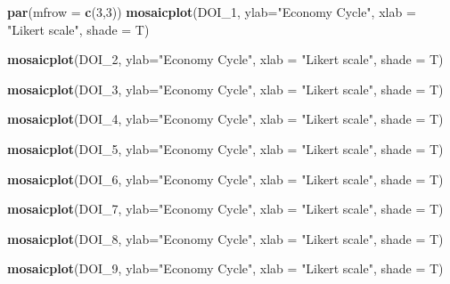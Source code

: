 \documentclass[
]{article}
\newenvironment{Shaded}{\begin{snugshade}}{\end{snugshade}}
\newcommand{\DataTypeTok}[1]{\textcolor[rgb]{0.13,0.29,0.53}{#1}}
\newcommand{\DecValTok}[1]{\textcolor[rgb]{0.00,0.00,0.81}{#1}}
\newcommand{\KeywordTok}[1]{\textcolor[rgb]{0.13,0.29,0.53}{\textbf{#1}}}
\newcommand{\NormalTok}[1]{#1}
\newcommand{\StringTok}[1]{\textcolor[rgb]{0.31,0.60,0.02}{#1}}
\begin{document}
\begin{Shaded}
\begin{Highlighting}[]
\KeywordTok{par}\NormalTok{(}\DataTypeTok{mfrow =} \KeywordTok{c}\NormalTok{(}\DecValTok{3}\NormalTok{,}\DecValTok{3}\NormalTok{))}
   \KeywordTok{mosaicplot}\NormalTok{(DOI_}\DecValTok{1}\NormalTok{, }\DataTypeTok{ylab=}\StringTok{"Economy Cycle"}\NormalTok{, }\DataTypeTok{xlab =} \StringTok{"Likert scale"}\NormalTok{,}
               \DataTypeTok{shade =}\NormalTok{ T)}
    
    \KeywordTok{mosaicplot}\NormalTok{(DOI_}\DecValTok{2}\NormalTok{, }\DataTypeTok{ylab=}\StringTok{"Economy Cycle"}\NormalTok{, }\DataTypeTok{xlab =} \StringTok{"Likert scale"}\NormalTok{,}
               \DataTypeTok{shade =}\NormalTok{ T)}
    
    \KeywordTok{mosaicplot}\NormalTok{(DOI_}\DecValTok{3}\NormalTok{, }\DataTypeTok{ylab=}\StringTok{"Economy Cycle"}\NormalTok{, }\DataTypeTok{xlab =} \StringTok{"Likert scale"}\NormalTok{,}
               \DataTypeTok{shade =}\NormalTok{ T)    }

    \KeywordTok{mosaicplot}\NormalTok{(DOI_}\DecValTok{4}\NormalTok{, }\DataTypeTok{ylab=}\StringTok{"Economy Cycle"}\NormalTok{, }\DataTypeTok{xlab =} \StringTok{"Likert scale"}\NormalTok{,}
               \DataTypeTok{shade =}\NormalTok{ T)}
    
    \KeywordTok{mosaicplot}\NormalTok{(DOI_}\DecValTok{5}\NormalTok{, }\DataTypeTok{ylab=}\StringTok{"Economy Cycle"}\NormalTok{, }\DataTypeTok{xlab =} \StringTok{"Likert scale"}\NormalTok{,}
               \DataTypeTok{shade =}\NormalTok{ T)}
    
    \KeywordTok{mosaicplot}\NormalTok{(DOI_}\DecValTok{6}\NormalTok{, }\DataTypeTok{ylab=}\StringTok{"Economy Cycle"}\NormalTok{, }\DataTypeTok{xlab =} \StringTok{"Likert scale"}\NormalTok{,}
               \DataTypeTok{shade =}\NormalTok{ T)}
    
    \KeywordTok{mosaicplot}\NormalTok{(DOI_}\DecValTok{7}\NormalTok{, }\DataTypeTok{ylab=}\StringTok{"Economy Cycle"}\NormalTok{, }\DataTypeTok{xlab =} \StringTok{"Likert scale"}\NormalTok{,}
               \DataTypeTok{shade =}\NormalTok{ T)}
    
    \KeywordTok{mosaicplot}\NormalTok{(DOI_}\DecValTok{8}\NormalTok{, }\DataTypeTok{ylab=}\StringTok{"Economy Cycle"}\NormalTok{, }\DataTypeTok{xlab =} \StringTok{"Likert scale"}\NormalTok{,}
               \DataTypeTok{shade =}\NormalTok{ T)}
    
    \KeywordTok{mosaicplot}\NormalTok{(DOI_}\DecValTok{9}\NormalTok{, }\DataTypeTok{ylab=}\StringTok{"Economy Cycle"}\NormalTok{, }\DataTypeTok{xlab =} \StringTok{"Likert scale"}\NormalTok{,}
               \DataTypeTok{shade =}\NormalTok{ T)}
\end{Highlighting}
\end{Shaded}
\end{document}
